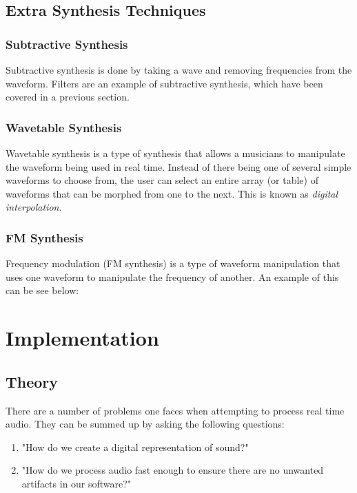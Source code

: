 \documentclass[12pt]{article}
\begin{document}
\subsection{Extra Synthesis Techniques}

\subsubsection*{Subtractive Synthesis}
Subtractive synthesis is done by taking a wave and removing frequencies from the waveform. Filters are an example of subtractive synthesis, which have been covered in a previous section. 

\subsubsection*{Wavetable Synthesis}
Wavetable synthesis is a type of synthesis that allows a musicians to manipulate the waveform being used in real time. Instead of there being one of several simple waveforms to choose from, the user can select an entire array (or table) of waveforms that can be morphed from one to the next. This is known as \textit{digital interpolation}. 

\subsubsection*{FM Synthesis}
Frequency modulation (FM synthesis) is a type of waveform manipulation that uses one waveform to manipulate the frequency of another. An example of this can be see below: 


\section{Implementation}

\subsection{Theory}
There are a number of problems one faces when attempting to process real time audio. They can be summed up by asking the following questions:

\begin{enumerate}
	\item "How do we create a digital representation of sound?"
	\item "How do we process audio fast enough to ensure there are no unwanted artifacts in our software?"
\end{enumerate}
\end{document}
